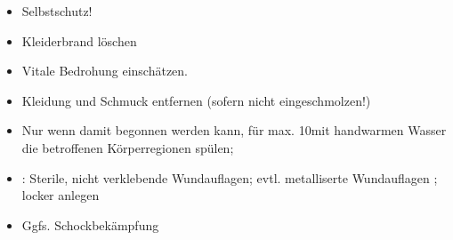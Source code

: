 \label{m:verbrennung-leicht}
\begin{itemize}
  \item Selbstschutz!
  \item Kleiderbrand löschen
  \item Vitale Bedrohung einschätzen. \TxBeiVit \TxMassVitMK
  \item Kleidung und Schmuck entfernen (sofern nicht  eingeschmolzen!)
  \item Nur wenn 
  damit begonnen werden kann, für max. 10\Min* mit handwarmen
  Wasser die betroffenen Körperregionen spülen;
  
  \item {}: Sterile, nicht verklebende
  Wundauflagen; evtl. metalliserte Wundauflagen
  \cite{Helfen2008,RedelsteinerHRNS1}; locker anlegen
  \item Ggfs. Schockbekämpfung
\end{itemize}